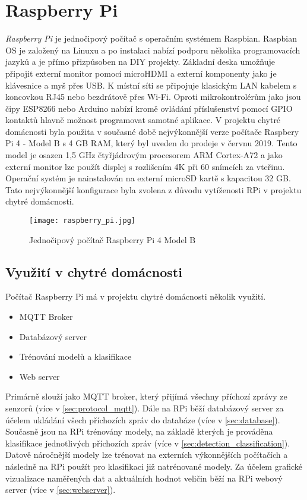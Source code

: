 \section{Raspberry Pi} \label{sec:raspberry_pi}
\textit{Raspberry Pi} je jednočipový počítač s operačním systémem Raspbian. Raspbian OS je založený na Linuxu a po instalaci nabízí podporu několika programovacích jazyků a je přímo přizpůsoben na DIY projekty. Základní deska umožňuje připojit externí monitor pomocí microHDMI a externí komponenty jako je klávesnice a myš přes USB. K místní síti se připojuje klasickým LAN kabelem s koncovkou RJ45 nebo bezdrátově přes Wi-Fi. Oproti mikrokontrolérům jako jsou čipy ESP8266 nebo Arduino nabízí kromě ovládání příslušenství pomocí GPIO kontaktů hlavně možnost programovat samotné aplikace. V projektu chytré domácnosti byla použita v současné době nejvýkonnější verze počítače Raspbery Pi 4 - Model B s 4 GB RAM, který byl uveden do prodeje v červnu 2019. Tento model je osazen 1,5 GHz čtyřjádrovým procesorem ARM Cortex-A72 a jako externí monitor lze použít displej s rozlišením 4K při 60 snímcích za vteřinu. Operační systém je nainstalován na externí microSD kartě s kapacitou 32 GB. Tato nejvýkonnější konfigurace byla zvolena z důvodu vytíženosti RPi v projektu chytré domácnosti. 

\begin{figure}[H]
  \centering
  \texttt{[image: raspberry\_pi.jpg]}
  \caption{Jednočipový počítač Raspberry Pi 4 Model B}
  \label{fig:raspberry_pi}
\end{figure} 

\subsection*{Využití v chytré domácnosti}
Počítač Raspberry Pi má v projektu chytré domácnosti několik využití. 

\begin{itemize}
  \item MQTT Broker
  \item Databázový server
  \item Trénování modelů a klasifikace
  \item Web server
\end{itemize}

Primárně slouží jako MQTT broker, který přijímá všechny příchozí zprávy ze senzorů (více v \cref{sec:protocol_mqtt}). Dále na RPi běží databázový server za účelem ukládání všech příchozích zpráv do databáze (více v \cref{sec:database}). Současně jsou na RPi trénovány modely, na základě kterých je prováděna klasifikace jednotlivých příchozích zpráv (více v \cref{sec:detection_classification}). Datově náročnější modely lze trénovat na externích výkonnějších počítačích a následně na RPi použít pro klasifikaci již natrénované modely. Za účelem grafické vizualizace naměřených dat a aktuálních hodnot veličin běží na RPi webový server (více v \cref{sec:webserver}). 

